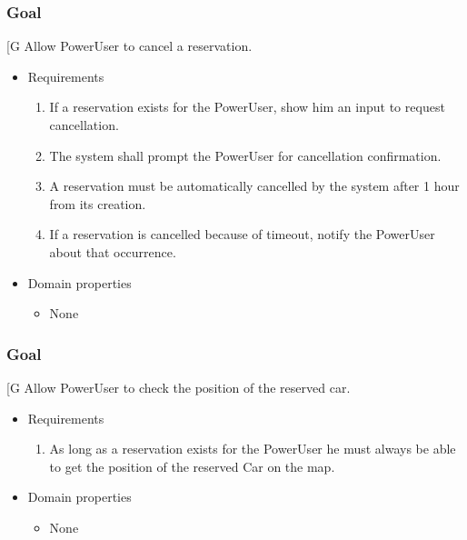     \subsubsection{Goal }
    {[}G\arabic{goalctr}{]}
    Allow PowerUser to cancel a reservation.
    \begin{itemize}
        \item Requirements
        \begin{enumerate}[REQ]
    			\item If a reservation exists for the PowerUser, show him an input to request cancellation.
    			\item The system shall prompt the PowerUser for cancellation confirmation.
    			\item A reservation must be automatically cancelled by the system after 1 hour from its creation.
    			\item If a reservation is cancelled because of timeout, notify the PowerUser about that occurrence.
        \end{enumerate}
        \item Domain properties
        \begin{itemize}
    			\item None
        \end{itemize}
    \end{itemize}

    \subsubsection{Goal }
    {[}G\arabic{goalctr}{]}
	Allow PowerUser to check the position of the reserved car.
    \begin{itemize}
        \item Requirements
        \begin{enumerate}[REQ]
    	        \item As long as a reservation exists for the PowerUser he must always be able to get the position of the reserved Car on the map.
        \end{enumerate}
        \item Domain properties
        \begin{itemize}
    			\item None
        \end{itemize}
    \end{itemize}

